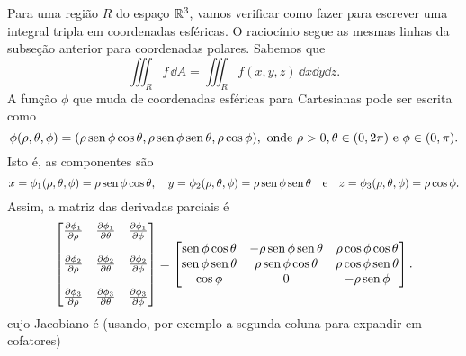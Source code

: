 \documentclass[../livro.tex]{subfiles}  %
\begin{document}
Para uma região $R$ do espaço $\mathbb{R}^3$, vamos verificar como fazer para escrever uma integral tripla em coordenadas esféricas. O raciocínio segue as mesmas linhas da subseção anterior para coordenadas polares. Sabemos que
\[
\iiint_R f \, \dd A = \iiint_R f(x,y, z) \, \dd x \dd y  \dd z.
\] A função $\phi$ que muda de coordenadas esféricas para Cartesianas pode ser escrita como
\[
\phi (\rho, \theta, \phi) = (\rho \operatorname{sen} \phi \cos \theta, \rho \operatorname{sen} \phi \operatorname{sen} \theta, \rho \cos \phi), \text{ onde } \rho> 0, \theta \in (0,2\pi) \text{ e } \phi \in (0, \pi).
\] Isto é, as componentes são
\[
x = \phi_1 (\rho, \theta, \phi) = \rho \operatorname{sen} \phi \cos \theta, \quad 
y = \phi_2 (\rho, \theta, \phi) = \rho \operatorname{sen} \phi \operatorname{sen} \theta \quad \text{e} \quad 
z = \phi_3 (\rho, \theta, \phi) = \rho \cos \phi.
\] Assim, a matriz das derivadas parciais é
\[
\begin{bmatrix}
\frac{\partial \phi_1}{\partial \rho} & \frac{\partial \phi_1}{\partial \theta} & \frac{\partial \phi_1}{\partial \phi}  \\
& & \\
\frac{\partial \phi_2}{\partial \rho} & \frac{\partial \phi_2}{\partial \theta} & \frac{\partial \phi_2}{\partial \phi} \\
& & \\
\frac{\partial \phi_3}{\partial \rho} & \frac{\partial \phi_3}{\partial \theta} & \frac{\partial \phi_3}{\partial \phi} \\
\end{bmatrix} = 
\begin{bmatrix}
\operatorname{sen} \phi \cos \theta & -\rho \operatorname{sen} \phi \operatorname{sen} \theta   & \rho \cos \phi \cos \theta \\
\operatorname{sen} \phi \operatorname{sen} \theta &  \rho \operatorname{sen} \phi \cos \theta   & \rho \cos \phi \operatorname{sen} \theta  \\
\cos \phi         &            0                  &    -\rho \operatorname{sen} \phi  \\
\end{bmatrix}.
\] cujo Jacobiano é (usando, por exemplo a segunda coluna para expandir em cofatores)
\end{document}
